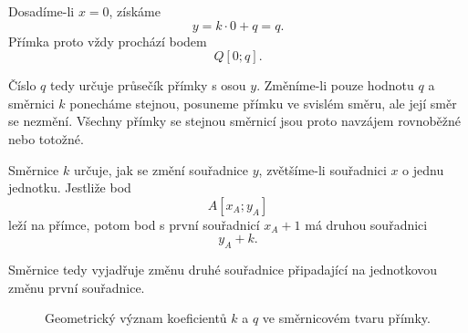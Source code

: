 Dosadíme-li $x=0$, získáme
\[
    y=k\cdot0+q=q.
\]
Přímka proto vždy prochází bodem
\begin{equation}\label{eq:Y_intercept_point}
    Q[0;q].
\end{equation}

Číslo $q$ tedy určuje průsečík přímky s osou $y$. Změníme-li pouze
hodnotu $q$ a směrnici $k$ ponecháme stejnou, posuneme přímku ve
svislém směru, ale její směr se nezmění. Všechny přímky se stejnou
směrnicí jsou proto navzájem rovnoběžné nebo totožné.

Směrnice $k$ určuje, jak se změní souřadnice $y$, zvětšíme-li
souřadnici $x$ o jednu jednotku. Jestliže bod
\[
    A[x_A;y_A]
\]
leží na přímce, potom bod s první souřadnicí $x_A+1$ má druhou
souřadnici
\[
    y_A+k.
\]

Směrnice tedy vyjadřuje změnu druhé souřadnice připadající na jednotkovou
změnu první souřadnice.

\begin{figure}[H]
    \centering

    \caption{Geometrický význam koeficientů $k$ a $q$
    ve směrnicovém tvaru přímky.}
    \label{fig:Slope_intercept_coefficients}
\end{figure}

